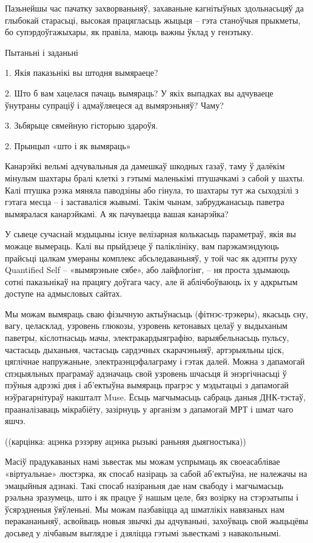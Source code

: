 Пазьнейшы час пачатку захворваньняў, захаваньне кагнітыўных здольнасьцяў да глыбокай старасьці, высокая працягласьць жыцьця – гэта станоўчыя прыкметы, бо супэрдоўгажыхары, як правіла, маюць важны ўклад у генэтыку.

Пытаньні і заданьні

1. Якія паказьнікі вы штодня вымяраеце?

2. Што б вам хацелася пачаць вымяраць? У якіх выпадках вы адчуваеце ўнутраны супраціў і адмаўляецеся ад вымярэньняў? Чаму?

3. Зьбярыце сямейную гісторыю здароўя.


2. Прынцып «што і як вымяраць»

Канарэйкі вельмі адчувальныя да дамешкаў шкодных газаў, таму ў далёкім мінулым шахтары бралі клеткі з гэтымі маленькімі птушачкамі з сабой у шахты. Калі птушка рэзка мяняла паводзіны або гінула, то шахтары тут жа сыходзілі з гэтага месца – і заставаліся жывымі. Такім чынам, забруджанасьць паветра вымяралася канарэйкамі. А як пачуваецца вашая канарэйка?

У сьвеце сучаснай мэдыцыны існуе велізарная колькасьць параметраў, якія вы можаце вымераць. Калі вы прыйдзеце ў паліклініку, вам парэкамэндуюць прайсьці цалкам умераны комплекс абсьледаваньняў, у той час як адэпты руху Quantified Self – «вымярэньне сябе», або лайфлогінг, – ня проста здымаюць сотні паказьнікаў на працягу доўгага часу, але й аблічбоўваюць іх у адкрытым доступе на адмысловых сайтах.

Мы можам вымяраць сваю фізычную актыўнасьць (фітнэс-трэкеры), якасьць сну, вагу, целасклад, узровень глюкозы, узровень кетонавых целаў у выдыханым паветры, кіслотнасьць мачы, электракардыяграфію, варыябельнасьць пульсу, частасьць дыханьня, частасьць сардэчных скарачэньняў, артэрыяльны ціск, цяглічнае напружаньне, электраэнцэфалаграму і гэтак далей. Можна з дапамогай спэцыяльных праграмаў адзначаць свой узровень шчасьця й энэргічнасьці ў пэўныя адрэзкі дня і аб'ектыўна вымяраць прагрэс у мэдытацыі з дапамогай нэўрагарнітураў накшталт Muse. Ёсьць магчымасьць сабраць даныя ДНК-тэстаў, прааналізаваць мікрабіёту, зазірнуць у арганізм з дапамогай МРТ і шмат чаго яшчэ.

((карцінка: ацэнка рэзэрву ацэнка рызыкі раньняя дыягностыка))

Масіў прадукаваных намі зьвестак мы можам успрымаць як своеасаблівае «віртуальнае» люстэрка, як спосаб назіраць за сабой аб'ектыўна, не належачы на эмацыйныя адзнакі. Такі спосаб назіраньня дае нам свабоду і магчымасьць рэальна зразумець, што і як працуе ў нашым целе, бяз возірку на стэрэатыпы і ўсярэдненыя ўяўленьні. Мы можам пазбавіцца ад шматлікіх навязаных нам перакананьняў, асвойваць новыя звычкі ды адчуваньні, захоўваць свой жыцьцёвы досьвед у лічбавым выглядзе і дзяліцца гэтымі зьвесткамі з навакольнымі.

